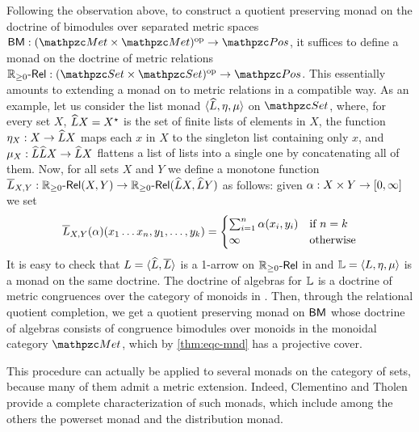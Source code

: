 \begin{example}
Following the observation above, 
to construct a quotient preserving monad on the doctrine of bimodules over separated metric spaces 
$\fun\BM{\bop\Met}{\Pos}$, 
it suffices to define a monad on the doctrine of metric relations 
$\fun{\VRel\RPos}{\bop\Set}{\Pos}$. 
This essentially amounts to extending  a monad on \Set to metric relations in a compatible way. 
% 
As an example, let us consider the list monad ${\langle \widehat{L},\eta,\mu \rangle }$ on $\Set$, where, for every set $X$, 
$\widehat{L} X = X^\star$ is the set of finite lists of elements in $X$, the function
$\fun{\eta_X}{X}{\fn{L}X}$ maps each $x$ in $X$ to the singleton list containing only $x$, and 
$\fun{\mu_X}{\fn{L}\fn{L}X}{\fn{L}X}$ flattens a list of lists into a single one by concatenating all of them. 
Now, for all sets $X$ and $Y$ we define a monotone function 
$\fun{\lift{L}_{X,Y}}{\VRel\RPos(X,Y)}{\VRel\RPos(\fn{L}X,\fn{L}Y)}$
as follows: 
given $\fun{\relr}{X\times Y}{[0,\infty]}$ we set 
\[ 
\overline{L}_{X,Y}(\alpha)(x_1\ldots x_n, y_1,\ldots,y_k) = 
\begin{cases}
  \sum_{i = 1}^n \alpha(x_i,y_i) & \text{if } n = k \\
  \infty  &\text{otherwise} 
\end{cases}
\]
It is easy to check that 
$L = {\langle \widehat{L},\overline{L} \rangle }$ is a 1-arrow on ${\mathbb{R}_{\ge 0}}\text{-}\mathsf{Rel}$ in \RDtn and 
$\mathbb{L} = {\langle L,\eta,\mu \rangle }$ is a monad on the same doctrine. 
The doctrine of algebras for $\mathbb{L}$ is a doctrine of metric congruences over the category of monoids in \Set. 
% 
Then, through the relational quotient completion, we get a quotient preserving monad on $\mathsf{BM}$ whose doctrine of algebras consists of congruence bimodules over monoids in the monoidal category $\Met$, which by \cref{thm:eqc-mnd} has a projective cover. 

This procedure can actually be applied to several monads on the category of sets, because many of them admit a metric extension. 
Indeed, Clementino and Tholen~\cite{ClementinoT14} provide a complete characterization of such monads, which include among the others the powerset monad and the distribution  monad.
% 
\end{example}


